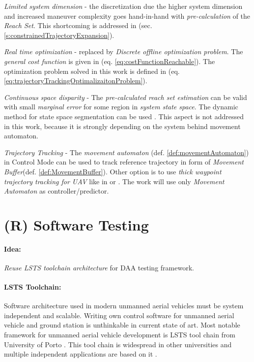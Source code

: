 \emph{Limited system dimension} - the discretization due the higher system dimension and  increased maneuver complexity goes hand-in-hand with \emph{pre-calculation} of the \emph{Reach Set}. This shortcoming is addressed in (sec. \ref{s:constrainedTrajectoryExpansion}).

\emph{Real time optimization} -  replaced by \emph{Discrete offline optimization problem}. The \emph{general cost function} is given in (eq. \ref{eq:costFunctionReachable}). The optimization problem solved in this work is defined in (eq. \ref{eq:trajectoryTrackingOptimalizaitonProblem}).

\emph{Continuous space disparity} - The \emph{pre-calculated reach set estimation} can be valid with small \emph{marginal error} for some region in \emph{system state space}. The dynamic method for state space segmentation can be used \cite{takahashi1996reasonable}. This aspect is not addressed in this work, because it is strongly depending on the system behind movement automaton. 

\emph{Trajectory Tracking} - The \emph{movement automaton} (def. \ref{def:movementAutomaton}) in Control Mode can be used to track reference trajectory in form of \emph{Movement Buffer}(def. \ref{def:MovementBuffer}). Other option is to use \emph{thick waypoint trajectory tracking for UAV} like in \cite{kaminer1998trajectory} or \cite{murillo2015generalized}. The work will use only \emph{Movement Automaton} as controller/predictor. 




\section{(R) Software Testing}\label{s:TestingFrameworkTheory}

\paragraph{Idea:} \emph{Reuse LSTS toolchain architecture} for DAA testing framework.

\paragraph{LSTS Toolchain:} Software architecture used in modern unmanned aerial vehicles must be system independent and scalable. Writing own control software for unmanned aerial vehicle and ground station is unthinkable in current state of art.  Most notable framework for unmanned aerial vehicle development is LSTS tool chain from University of Porto \cite{merani2011underwater}. This tool chain is widespread in other universities and multiple independent applications are based on it \cite{rajan2013towards}.

